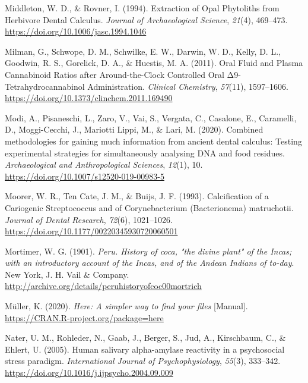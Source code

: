 \documentclass[
  letterpaper,
]{book}
\newlength{\cslhangindent}
\newlength{\cslentryspacingunit} %
\newenvironment{CSLReferences}[2] %
 {%
  \setlength{\parindent}{0pt}
  \ifodd #1
  \let\oldpar\par
  \def\par{\hangindent=\cslhangindent\oldpar}
  \fi
  \setlength{\parskip}{#2\cslentryspacingunit}
 }%
 {}
\begin{document}
\begin{CSLReferences}{1}{0}
\leavevmode{}%
Middleton, W. D., \& Rovner, I. (1994). Extraction of {Opal Phytoliths}
from {Herbivore Dental Calculus}. \emph{Journal of Archaeological
Science}, \emph{21}(4), 469--473.
\url{https://doi.org/10.1006/jasc.1994.1046}

\leavevmode{}%
Milman, G., Schwope, D. M., Schwilke, E. W., Darwin, W. D., Kelly, D.
L., Goodwin, R. S., Gorelick, D. A., \& Huestis, M. A. (2011). Oral
{Fluid} and {Plasma Cannabinoid Ratios} after {Around-the-Clock
Controlled Oral Δ9-Tetrahydrocannabinol Administration}. \emph{Clinical
Chemistry}, \emph{57}(11), 1597--1606.
\url{https://doi.org/10.1373/clinchem.2011.169490}

\leavevmode{}%
Modi, A., Pisaneschi, L., Zaro, V., Vai, S., Vergata, C., Casalone, E.,
Caramelli, D., Moggi-Cecchi, J., Mariotti Lippi, M., \& Lari, M. (2020).
Combined methodologies for gaining much information from ancient dental
calculus: Testing experimental strategies for simultaneously analysing
{DNA} and food residues. \emph{Archaeological and Anthropological
Sciences}, \emph{12}(1), 10.
\url{https://doi.org/10.1007/s12520-019-00983-5}

\leavevmode{}%
Moorer, W. R., Ten Cate, J. M., \& Buijs, J. F. (1993). Calcification of
a {Cariogenic Streptococcus} and of {Corynebacterium} ({Bacterionema})
matruchotii. \emph{Journal of Dental Research}, \emph{72}(6),
1021--1026. \url{https://doi.org/10.1177/00220345930720060501}

\leavevmode{}%
Mortimer, W. G. (1901). \emph{Peru. {History} of coca, "the divine
plant" of the {Incas}; with an introductory account of the {Incas}, and
of the {Andean Indians} of to-day}. {New York, J. H. Vail \& Company}.
\url{http://archive.org/details/peruhistoryofcoc00mortrich}

\leavevmode{}%
Müller, K. (2020). \emph{Here: {A} simpler way to find your files}
{[}Manual{]}. \url{https://CRAN.R-project.org/package=here}

\leavevmode{}%
Nater, U. M., Rohleder, N., Gaab, J., Berger, S., Jud, A., Kirschbaum,
C., \& Ehlert, U. (2005). Human salivary alpha-amylase reactivity in a
psychosocial stress paradigm. \emph{International Journal of
Psychophysiology}, \emph{55}(3), 333--342.
\url{https://doi.org/10.1016/j.ijpsycho.2004.09.009}


\end{CSLReferences}
\end{document}
